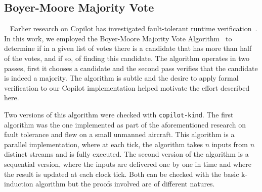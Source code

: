 \subsection{Boyer-Moore Majority Vote}~\label{sec:mvote}
Earlier research on Copilot  has investigated fault-tolerant
runtime verification~\cite{pike-isse-13}. In this work, we employed the Boyer-Moore
Majority Vote Algorithm~\cite{MooreBoyer82,Hesselink2005} to determine
if in a given list of votes there is a candidate that has more than
half of the votes, and if so, of finding this candidate. The algorithm
operates in two passes, first it chooses a candidate and the second
pass verifies that the candidate is indeed a majority.  The algorithm
is subtle and the desire to apply formal verification to our Copilot
implementation helped motivate the effort described here.   




%



Two versions of this algorithm were checked with
\texttt{copilot-kind}. The first algorithm was the one implemented as
part of the aforementioned research on fault tolerance and flew on a
small unmanned aircraft. This algorithm 
is a parallel implementation, where at each tick, the
algorithm takes $n$ inputs from $n$ distinct streams and is fully
executed. The second version of the algorithm  is a sequential version, where the inputs are
delivered one by one in time and where the result is updated at each
clock tick. Both can be checked with the basic k-induction algorithm
but the proofs involved are of different natures.


